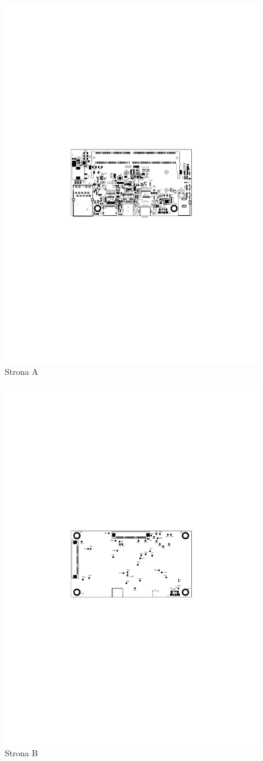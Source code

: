 \begin{figure}[H]
	\centering
	\includegraphics[width=0.7\linewidth,clip, trim=5.5cm 12cm 5.5cm 11cm]{./chapters/chapter5/Jetson_A.pdf}
	\caption{Strona A}\label{jetson:StronaA}
\end{figure}


\begin{figure}[H]
	\centering
	\includegraphics[width=0.7\linewidth,clip, trim=5.5cm 12cm 5.5cm 11cm]{./chapters/chapter5/Jetson_B.pdf}
	\caption{Strona B}\label{jetson:StronaB}
\end{figure}

